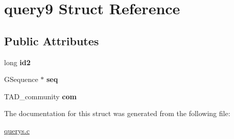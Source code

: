 \hypertarget{structquery9}{}\section{query9 Struct Reference}
\label{structquery9}
\subsection*{Public Attributes}
\begin{DoxyCompactItemize}
\item 
long {\bfseries id2}\hypertarget{structquery9_ad08fe8bd54dcbb96af313c8473bb0736}{}\label{structquery9_ad08fe8bd54dcbb96af313c8473bb0736}

\item 
G\+Sequence $\ast$ {\bfseries seq}\hypertarget{structquery9_adfba84a8adebdc293ae76f924a4dca2f}{}\label{structquery9_adfba84a8adebdc293ae76f924a4dca2f}

\item 
T\+A\+D\+\_\+community {\bfseries com}\hypertarget{structquery9_a790a5ad4278f971f20226dc15f822373}{}\label{structquery9_a790a5ad4278f971f20226dc15f822373}

\end{DoxyCompactItemize}


The documentation for this struct was generated from the following file\+:\begin{DoxyCompactItemize}
\item 
\hyperlink{querys_8c}{querys.\+c}\end{DoxyCompactItemize}
